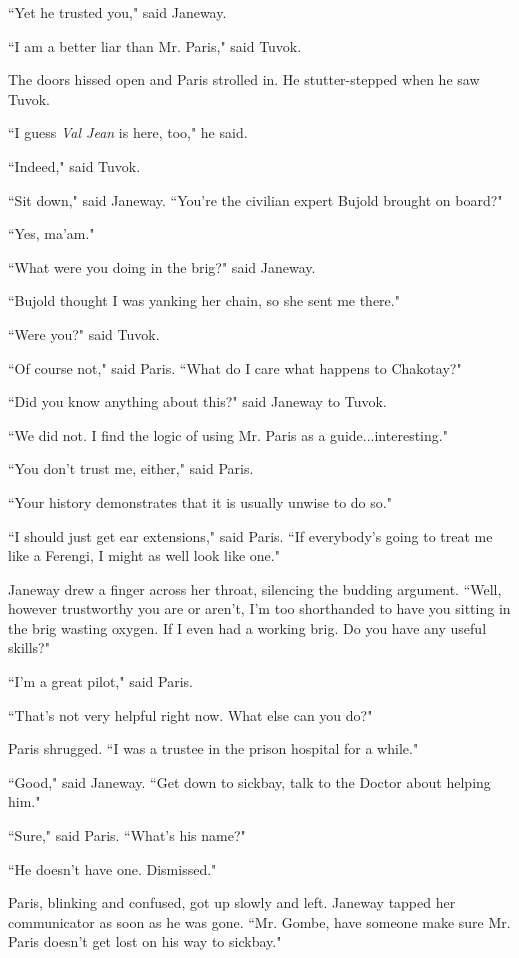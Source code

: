 \documentclass[twoside,letterpaper,12pt]{memoir}
\begin{document}
``Yet he trusted you," said Janeway.

``I am a better liar than Mr. Paris," said Tuvok.

The doors hissed open and Paris strolled in. He stutter-stepped when he saw Tuvok.

``I guess \textit{Val Jean} is here, too," he said.

``Indeed," said Tuvok.

``Sit down," said Janeway. ``You're the civilian expert Bujold brought on board?"

``Yes, ma'am."

``What were you doing in the brig?" said Janeway.

``Bujold thought I was yanking her chain, so she sent me there."

``Were you?" said Tuvok.

``Of course not," said Paris. ``What do I care what happens to Chakotay?"

``Did you know anything about this?" said Janeway to Tuvok.

``We did not. I find the logic of using Mr. Paris as a guide...interesting."

``You don't trust me, either," said Paris.

``Your history demonstrates that it is usually unwise to do so."

``I should just get ear extensions," said Paris. ``If everybody's going to treat me like a Ferengi, I might as well look like one."

Janeway drew a finger across her throat, silencing the budding argument. ``Well, however trustworthy you are or aren't, I'm too shorthanded to have you sitting in the brig wasting oxygen. If I even had a working brig. Do you have any useful skills?"

``I'm a great pilot," said Paris.

``That's not very helpful right now. What else can you do?"

Paris shrugged. ``I was a trustee in the prison hospital for a while."

``Good," said Janeway. ``Get down to sickbay, talk to the Doctor about helping him."

``Sure," said Paris. ``What's his name?"

``He doesn't have one. Dismissed."

Paris, blinking and confused, got up slowly and left. Janeway tapped her communicator as soon as he was gone. ``Mr. Gombe, have someone make sure Mr. Paris doesn't get lost on his way to sickbay."
\end{document}
